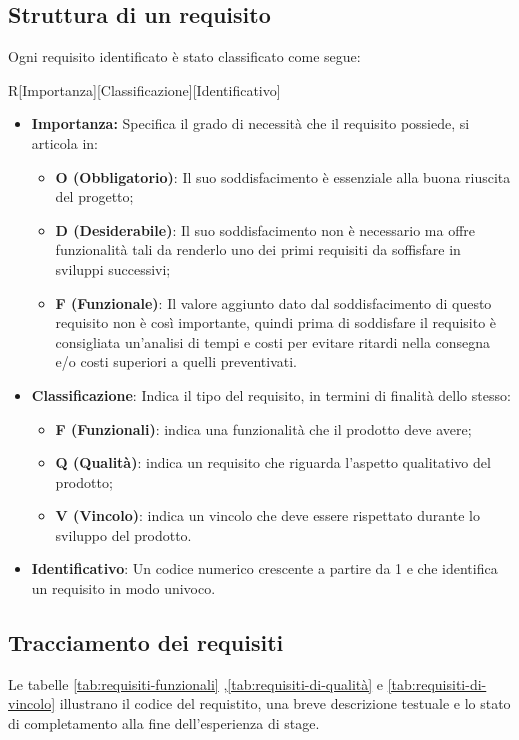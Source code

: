 \subsection{Struttura di un requisito}
Ogni requisito identificato è stato classificato come segue:
\begin{center}
	R[Importanza][Classificazione][Identificativo]
\end{center}
\begin{itemize}
	\item \textbf{Importanza:} Specifica il grado di necessità che il requisito possiede, si articola in:
	\begin{itemize}
		\item \textbf{O (Obbligatorio)}: Il suo soddisfacimento è essenziale alla buona riuscita del progetto;
		\item \textbf{D (Desiderabile)}: Il suo soddisfacimento non è necessario ma offre funzionalità tali da renderlo uno dei primi requisiti da soffisfare in sviluppi successivi;
		\item \textbf{F (Funzionale)}: Il valore aggiunto dato dal soddisfacimento di questo requisito non è così importante, quindi prima di soddisfare il requisito è consigliata un’analisi di tempi e costi per evitare ritardi nella consegna e/o costi superiori a quelli preventivati.
	\end{itemize}
	\item \textbf{Classificazione}: Indica il tipo del requisito, in termini di finalità dello stesso:
	\begin{itemize}
		\item \textbf{F (Funzionali)}: indica una funzionalità che il prodotto deve avere; 
		\item \textbf{Q (Qualità)}: indica un requisito che riguarda l'aspetto qualitativo del prodotto;
		\item \textbf{V (Vincolo)}: indica un vincolo che deve essere rispettato durante lo sviluppo del prodotto.
	\end{itemize} 
	\item \textbf{Identificativo}: Un codice numerico crescente a partire da 1 e che identifica un requisito in modo univoco. 
\end{itemize}

\newpage

\subsection{Tracciamento dei requisiti}
Le tabelle \ref{tab:requisiti-funzionali} ,\ref{tab:requisiti-di-qualità} e \ref{tab:requisiti-di-vincolo} illustrano il codice del requistito, una breve descrizione testuale e lo stato di completamento alla fine dell'esperienza di stage. \\

